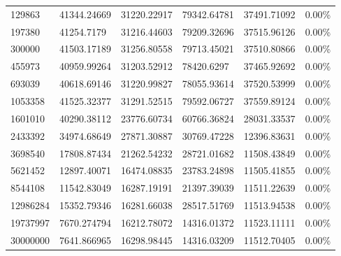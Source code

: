 \documentclass[12pt]{article} %
\begin{document}
\begin{table}[]
{\begin{tabular}{@{}llllll@{}}
129863 & 41344.24669 & 31220.22917 & 79342.64781 & 37491.71092 & 0.00\% \\
197380 & 41254.7179 & 31216.44603 & 79209.32696 & 37515.96126 & 0.00\% \\
300000 & 41503.17189 & 31256.80558 & 79713.45021 & 37510.80866 & 0.00\% \\
455973 & 40959.99264 & 31203.52912 & 78420.6297 & 37465.92692 & 0.00\% \\
693039 & 40618.69146 & 31220.99827 & 78055.93614 & 37520.53999 & 0.00\% \\
1053358 & 41525.32377 & 31291.52515 & 79592.06727 & 37559.89124 & 0.00\% \\
1601010 & 40290.38112 & 23776.60734 & 60766.36824 & 28031.33537 & 0.00\% \\
2433392 & 34974.68649 & 27871.30887 & 30769.47228 & 12396.83631 & 0.00\% \\
3698540 & 17808.87434 & 21262.54232 & 28721.01682 & 11508.43849 & 0.00\% \\
5621452 & 12897.40071 & 16474.08835 & 23783.24898 & 11505.41855 & 0.00\% \\
8544108 & 11542.83049 & 16287.19191 & 21397.39039 & 11511.22639 & 0.00\% \\
12986284 & 15352.79346 & 16281.66038 & 28517.51769 & 11513.94538 & 0.00\% \\
19737997 & 7670.274794 & 16212.78072 & 14316.01372 & 11523.11111 & 0.00\% \\
30000000 & 7641.866965 & 16298.98445 & 14316.03209 & 11512.70405 & 0.00\% \\ \bottomrule
\end{tabular}%
}
\end{table}
\end{document}
